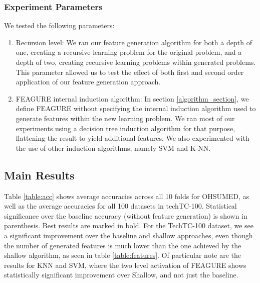 \documentclass[twoside,11pt]{article}
\theoremstyle{definition}
\begin{document}
\subsubsection{Experiment Parameters}

We tested the following parameters: 
\begin{enumerate}
	\item Recursion level: We ran our feature generation algorithm for both a depth of one, creating a recursive learning problem for the original problem, and a depth of two, creating recursive learning problems within generated problems. This parameter allowed us to test the effect of both first and second order application of our feature generation approach.
	\item FEAGURE internal induction algorithm: In section \ref{algorithm_section}, we define FEAGURE without specifying the internal induction algorithm used to generate features within the new learning problem. We ran most of our experiments using a decision tree induction algorithm for that purpose, flattening the result to yield additional features. We also experimented with the use of other induction algorithms, namely SVM and K-NN.
\end{enumerate}


\subsection{Main Results}

Table \ref{table:acc} shows average accuracies across all 10 folds for OHSUMED, as well as the average accuracies for all 100 datasets in techTC-100. Statistical significance over the baseline accuracy (without feature generation) is shown in parenthesis. Best results are marked in bold.
For the TechTC-100 dataset, we see a significant improvement over the baseline and shallow approaches, even though the number of generated features is much lower than the one achieved by the shallow algorithm, as seen in table \ref{table:features}.
Of particular note are the results for KNN and SVM, where the two level activation of FEAGURE shows statistically significant improvement over Shallow, and not just the baseline. 
\end{document}
